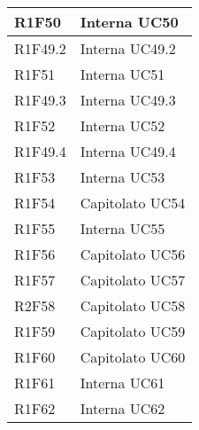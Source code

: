 \begin{center}
\begin{longtable}{|p{22mm}|p{44mm}|}
R1F50 &
Interna \newline
UC50 
\\
\hline

R1F49.2 &
Interna \newline
UC49.2 
\\
\hline

R1F51 &
Interna \newline
UC51 
\\
\hline

R1F49.3 &
Interna \newline
UC49.3 
\\
\hline

R1F52 &
Interna \newline
UC52 
\\
\hline

R1F49.4 &
Interna \newline
UC49.4 
\\
\hline

R1F53 &
Interna \newline
UC53 
\\
\hline

R1F54 &
Capitolato \newline
UC54 
\\
\hline

R1F55 &
Interna \newline
UC55 
\\
\hline

R1F56 &
Capitolato \newline
UC56 
\\
\hline

R1F57 &
Capitolato \newline
UC57 
\\
\hline

R2F58 &
Capitolato \newline
UC58 
\\
\hline

R1F59 &
Capitolato \newline
UC59 
\\
\hline

R1F60 &
Capitolato \newline
UC60 
\\
\hline

R1F61 &
Interna \newline
UC61 
\\
\hline

R1F62 &
Interna \newline
UC62 
\\
\hline


\end{longtable}
\end{center}
